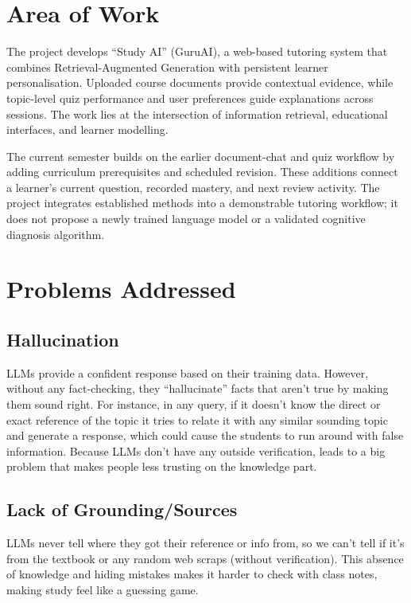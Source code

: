 \documentclass[11pt, a4paper, oneside]{report}
\begin{document}
\section{Area of Work}

The project develops ``Study AI'' (GuruAI), a web-based tutoring system that combines Retrieval-Augmented Generation with persistent learner personalisation. Uploaded course documents provide contextual evidence, while topic-level quiz performance and user preferences guide explanations across sessions. The work lies at the intersection of information retrieval, educational interfaces, and learner modelling.

The current semester builds on the earlier document-chat and quiz workflow by adding curriculum prerequisites and scheduled revision. These additions connect a learner's current question, recorded mastery, and next review activity. The project integrates established methods into a demonstrable tutoring workflow; it does not propose a newly trained language model or a validated cognitive diagnosis algorithm.

\section{Problems Addressed}

\subsection{Hallucination}
LLMs provide a confident response based on their training data. However, without any
fact-checking, they ``hallucinate'' facts that aren't true by making them sound right. For
instance, in any query, if it doesn't know the direct or exact reference of the topic it tries to
relate it with any similar sounding topic and generate a response, which could cause the
students to run around with false information. Because LLMs don't have any outside
verification, leads to a big problem that makes people less trusting on the knowledge part.

\subsection{Lack of Grounding/Sources}
LLMs never tell where they got their reference or info from, so we can't tell if it's from the textbook or any random web scraps (without verification). This absence of knowledge and hiding mistakes makes it harder to check with class notes, making study feel like a guessing game.
\end{document}
